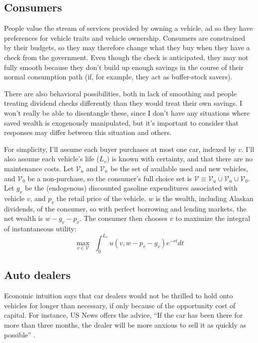\documentclass[11pt,letterpaper,oneside]{article}
\begin{document}
\begin{doublespacing}

\subsection{Consumers}


People value the stream of services provided by owning a vehicle, ad so they have preferences for vehicle traits and vehicle ownership.
Consumers are constrained by their budgets, so they may therefore change what they buy when they have a check from the government.
Even though the check is anticipated, they may not fully smooth because they don't build up enough savings in the course of their normal consumption path (if, for example, they act as buffer\hyp{}stock savers).

There are also behavioral possibilities, both in lack of smoothing and people treating dividend checks differently than they would treat their own savings.
I won't really be able to disentangle these, since I don't have any situations where saved wealth is exogenously manipulated, but it's important to consider that responses may differ between this situation and others.

For simplicity, I'll assume each buyer purchases at most one car, indexed by $v$.
I'll also assume each vehicle's life ($L_v$) is known with certainty, and that there are no maintenance costs.
Let $\mathcal{V}_u$ and $\mathcal{V}_n$ be the set of available used and new vehicles, and $\mathcal{V}_0$ be a non\hyp{}purchase, so the consumer's full choice set is $\mathcal{V} \equiv \mathcal{V}_u \cup \mathcal{V}_n \cup \mathcal{V}_0$.
Let $g_v$ be the (endogenous) discounted gasoline expenditures associated with vehicle $v$, and $p_v$ the retail price of the vehicle.
$w$ is the wealth, including Alaskan dividends, of the consumer, so with perfect borrowing and lending markets, the net wealth is $w - g_v - p_v$.
The consumer then chooses $v$ to maximize the integral of instantaneous utility:
\[
\max_{v \in \mathcal{V}} \ \ \int_0^{L_v} u(v, w - p_v - g_v) e^{-rt} dt
\]

\subsection{Auto dealers}

Economic intuition says that car dealers would not be thrilled to hold onto vehicles for longer than necessary, if only because of the opportunity cost of capital.
For instance, US News offers the advice, ``If the car has been there for more than three months, the dealer will be more anxious to sell it as quickly as possible''
\parencite{usnews_car_deals}.


\end{doublespacing}
\end{document}
